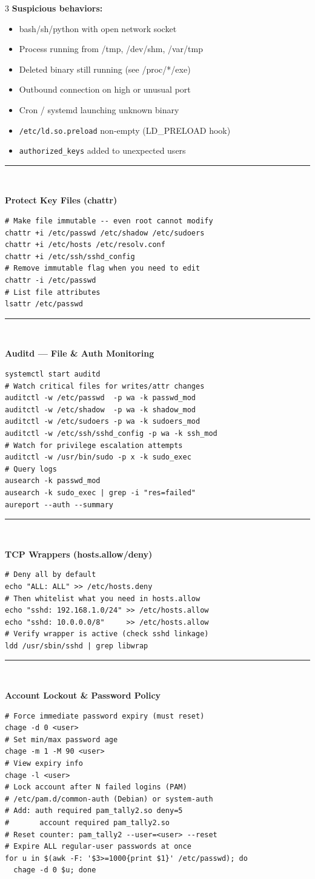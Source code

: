 \documentclass[10pt,landscape]{article}
\newcommand{\colorsec}[2]{%
  \vspace{1.5ex plus 0.5ex minus 0.5ex}%
  \noindent\rule{\linewidth}{0.4pt}\\[-0.7ex]%
  \noindent\colorbox{#1}{\parbox{\dimexpr\linewidth-2\fboxsep}{%
    \strut\textbf{\normalsize\color{sblue} #2}}}%
  \vspace{0.5ex}\par\nobreak%
}
\begin{document}
\begin{multicols}{3}
\textbf{Suspicious behaviors:}
\begin{itemize} \itemsep0pt \parskip0pt  
\item bash/sh/python with open network socket
\item Process running from /tmp, /dev/shm, /var/tmp
\item Deleted binary still running (see /proc/*/exe)
\item Outbound connection on high or unusual port
\item Cron / systemd launching unknown binary
\item \verb!/etc/ld.so.preload! non-empty (LD\_PRELOAD hook)
\item \verb!authorized_keys! added to unexpected users
\end{itemize}

\colorsec{secgray}{Protect Key Files (chattr)}
\begin{lstlisting}
# Make file immutable -- even root cannot modify
chattr +i /etc/passwd /etc/shadow /etc/sudoers
chattr +i /etc/hosts /etc/resolv.conf
chattr +i /etc/ssh/sshd_config
# Remove immutable flag when you need to edit
chattr -i /etc/passwd
# List file attributes
lsattr /etc/passwd
\end{lstlisting}

\colorsec{secteal}{Auditd --- File \& Auth Monitoring}
\begin{lstlisting}
systemctl start auditd
# Watch critical files for writes/attr changes
auditctl -w /etc/passwd  -p wa -k passwd_mod
auditctl -w /etc/shadow  -p wa -k shadow_mod
auditctl -w /etc/sudoers -p wa -k sudoers_mod
auditctl -w /etc/ssh/sshd_config -p wa -k ssh_mod
# Watch for privilege escalation attempts
auditctl -w /usr/bin/sudo -p x -k sudo_exec
# Query logs
ausearch -k passwd_mod
ausearch -k sudo_exec | grep -i "res=failed"
aureport --auth --summary
\end{lstlisting}

\colorsec{secorange}{TCP Wrappers (hosts.allow/deny)}
\begin{lstlisting}
# Deny all by default
echo "ALL: ALL" >> /etc/hosts.deny
# Then whitelist what you need in hosts.allow
echo "sshd: 192.168.1.0/24" >> /etc/hosts.allow
echo "sshd: 10.0.0.0/8"     >> /etc/hosts.allow
# Verify wrapper is active (check sshd linkage)
ldd /usr/sbin/sshd | grep libwrap
\end{lstlisting}

\colorsec{secpurple}{Account Lockout \& Password Policy}
\begin{lstlisting}
# Force immediate password expiry (must reset)
chage -d 0 <user>
# Set min/max password age
chage -m 1 -M 90 <user>
# View expiry info
chage -l <user>
# Lock account after N failed logins (PAM)
# /etc/pam.d/common-auth (Debian) or system-auth
# Add: auth required pam_tally2.so deny=5
#       account required pam_tally2.so
# Reset counter: pam_tally2 --user=<user> --reset
# Expire ALL regular-user passwords at once
for u in $(awk -F: '$3>=1000{print $1}' /etc/passwd); do
  chage -d 0 $u; done
\end{lstlisting}


\end{multicols}
\end{document}
